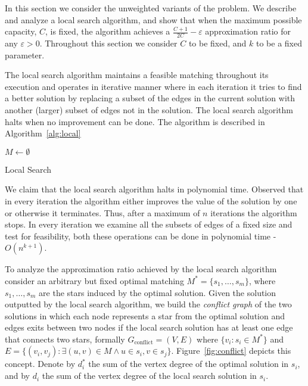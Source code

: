 In this section we consider the unweighted variants of the problem.
We describe and analyze a local search algorithm, 
and show that when the maximum possible capacity, $C$, is fixed, the algorithm achieves 
a $\frac{C + 1}{2C} - \varepsilon$ 
approximation ratio for any $\varepsilon > 0$.
Throughout this section we consider $C$ to be fixed, and $k$ to be a fixed parameter.  

The local search algorithm maintains a feasible matching throughout its execution
and operates in 
iterative manner where in each iteration it tries to find a better solution by
replacing a subset of the edges in the current solution with 
another (larger) subset of edges not in the solution.
The local search algorithm halts when no improvement can be done.
The algorithm is described in Algorithm~\ref{alg:local} 

\begin{algorithm}
$M \leftarrow \emptyset$								\\

\caption{
\label{alg:local}
Local Search}
\end{algorithm}


We claim that the local search algorithm halts in polynomial time.
Observed that in every iteration the algorithm either improves the value of the solution
by one or otherwise it terminates. 
Thus, after a maximum of $n$ iterations the algorithm stops.
In every iteration we examine all the subsets of edges of a fixed size and test for feasibility,
both these operations can be done in polynomial time - $O(n^{k + 1})$. 

To analyze the approximation ratio achieved by the local search algorithm consider an 
arbitrary but fixed optimal matching $M^* = \{s_1, \ldots, s_m\}$,
where $s_1, \ldots, s_m$ are the stars induced by the optimal solution.
Given the solution outputted by the local search algorithm,
we build the \emph{conflict graph} of the two solutions in which each node
represents a star from the optimal solution and edges exits between two nodes if
the local search solution has at least one edge that connects two stars, formally 
$G_\text{conflict} = (V, E)$ 
where $\{v_i : s_i \in M^* \}$ 
and $E = \{(v_i, v_j) : \exists (u,v) \in M \land u \in s_i, v \in s_j \}$.
Figure~\ref{fig:conflict} depicts this concept.
Denote by $d^*_i$ the sum of the vertex degree of the optimal solution in $s_i$, 
and by $d_i$ the sum of the vertex degree of the local search solution in $s_i$.

